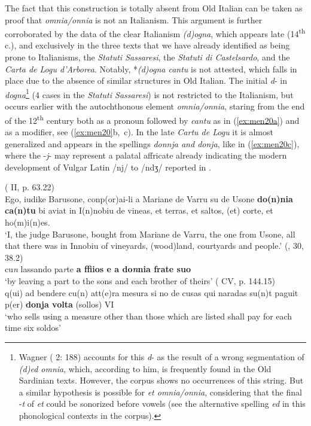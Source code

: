 \documentclass[output=paper,colorlinks,citecolor=brown]{langscibook}
\begin{document}
The fact that this construction is totally absent from Old Italian can be taken as proof that \textit{omnia/onnia} is not an Italianism. This argument is further corroborated by the data of the clear Italianism \textit{(d)ogna}, which appears late (14\textsuperscript{th} c.), and exclusively in the three texts that we have already identified as being prone to Italianisms, the \textit{Statuti Sassaresi}, the \textit{Statuti di Castelsardo}, and the \textit{Carta de Logu d’Arborea}. Notably, *\textit{(d)ogna cantu} is not attested, which falls in place due to the absence of similar structures in Old Italian. The initial \textit{d}- in \textit{dogna}\footnote{Wagner ( 2: 188) accounts for this \textit{d}- as the result of a wrong segmentation of \textit{(d)ed omnia}, which, according to him, is frequently found in the Old Sardinian texts. However, the corpus shows no occurrences of this string. But a similar hypothesis is possible for \textit{et omnia/onnia}, considering that the final -\textit{t} of \textit{et} could be sonorized before vowels (see the alternative spelling \textit{ed} in this phonological contexts in the corpus).} (4 cases in the \textit{Statuti Sassaresi}) is not restricted to the Italianism, but occurs earlier with the autochthonous element \textit{omnia/onnia}, staring from the end of the 12\textsuperscript{th} century both as a pronoun followed by \textit{cantu} as in (\ref{ex:men20a}) and as a modifier, see (\ref{ex:men20}b,~c). In the late \textit{Cartu de Logu} it is almost generalized and appears in the spellings \textit{donnja and donja}, like in (\ref{ex:men20c}), where the -\textit{j}- may represent a palatal affricate already indicating the modern development of Vulgar Latin /nj/ to /ndʒ/ reported in \citet[58]{Wagner1907}.

\ea\label{ex:men20}
    \ea\label{ex:men20a}( II, p. 63.22)\\
     Ego, iudike Barusone, conp(or)ai-li a Mariane de Varru su de Usone \textbf{do(n)nia ca(n)tu} bi aviat in I(n)nobiu de vineas, et terras, et saltos, (et) corte, et ho(m)i(n)es.\\
    ‘I, the judge Barusone, bought from Mariane de Varru, the one from Usone, all that there was in Innobiu of vineyards, (wood)land, courtyards and people.’
    \newpage
    \ex\label{ex:men20b}(, 30, 38.2)\\
     cu\textit{n} lassando pa\textit{r}te \textbf{a ffiios e a do\textit{n}nia frate suo}\\
    ‘by leaving a part to the sons and each brother of theirs’
    \ex\label{ex:men20c}( CV, p. 144.15)\\
     q(ui) ad bendere cu(n) att(e)ra mesura si no de cusas qui naradas su(n)t paguit p(er) \textbf{donja volta} (sollos) VI\\
    ‘who sells using a measure other than those which are listed shall pay for each time six soldos’
\z
\z 
\end{document}
